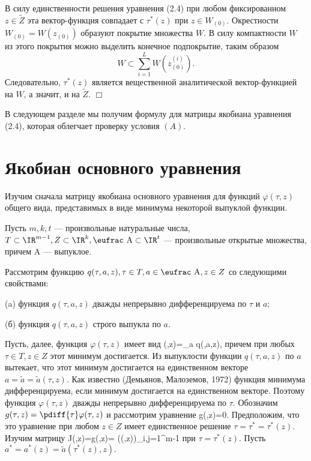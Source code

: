 В силу единственности решения уравнения (2.4) при любом
фиксированном $z\in \tilde Z$ эта вектор-функция совпадает с
$\tau^*(z)$ при $z\in W_{(0)}$. Окрестности $W_{(0)}=W(z_{(0)})$
образуют покрытие множества $W$. В силу компактности $W$ из этого
покрытия можно выделить конечное подпокрытие, таким образом
$$
W\subset \sum^L_{i=1} W(z^{(i)}_{(0)}).
$$
Следовательно, $\tau^*(z)$ является вещественной аналитической
вектор-функцией на $W$, а значит, и на $\tilde Z$. \hfill$\Box$

В следующем разделе мы получим формулу для матрицы якобиана
уравнения (2.4), которая облегчает проверку условия $(A)$.


\section{Якобиан основного уравнения}

Изучим сначала матрицу якобиана основного уравнения для функций
$\varphi(\tau,z)$ общего вида, представимых в виде минимума
некоторой выпуклой функции.

Пусть $m,k,t$ --- произвольные натуральные числа,
$T\subset\IR^{m-1},Z\subset\IR^k,{\mbox{\eufrac A}}\subset\IR^t$ ---
произвольные открытые множества, причем {\eufrac A} --- выпуклое.

Рассмотрим функцию $q(\tau,a,z),\tau\in T,a\in{\mbox{\eufrac
A}},z\in Z$ со следующими свойствами:

(a) функция $q(\tau,a,z)$ дважды непрерывно дифференцируема по
$\tau$ и $a;$

(б) функция $q(\tau,a,z)$ строго выпукла по $a.$

Пусть, далее, функция $\varphi(\tau,z)$ имеет вид \beq
 \varphi(\tau,z)=\minl_{a} q(\tau,a,z),
 \label{hi=min_q}
\eeq причем при любых $\tau\in T,z\in Z$ этот минимум достигается.
Из выпуклости функции $q(\tau,a,z)$ по $a$ вытекает, что этот
минимум достигается на единственном векторе
$a=\tilde{a}=\tilde{a}(\tau,z).$ Как известно (Демьянов, Малоземов,
1972) функция минимума дифференцируема, если минимум достигается на
единственном векторе. Поэтому функция $\varphi(\tau,z)$ дважды
непрерывно дифференцируема по $\tau.$ Обозначим
$g(\tau,z)=\pdiff{\tau}\varphi(\tau,z)$ и рассмотрим уравнение \beq
 g(\tau,z)=0.
 \label{eq:g=0}
\eeq Предположим, что это уравнение при любом $z\in Z$ имеет
единственное решение $\tau=\tau^*=\tau^*(z).$ Изучим матрицу \bea
 J(\tau,z)=\frac{\partial}{\partial\tau}g(\tau,z)=
 \left(\varphi(\tau,z)\right)_{i,j=1}^{m-1}
\eea при $\tau=\tau^*(z).$ Пусть
$a^*=a^*(z)=\tilde{a}(\tau^*(z),z).$

